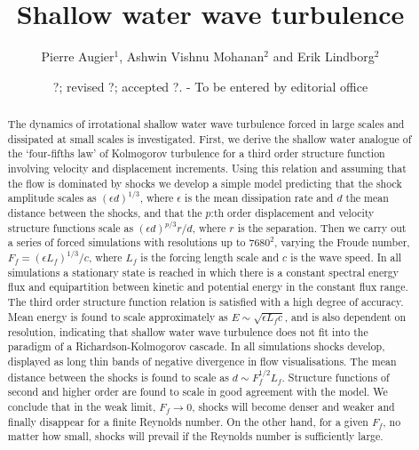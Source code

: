 \documentclass{jfm}
\title[Shallow water wave turbulence]%
{ Shallow water wave turbulence}
\author[P. Augier, A.V. Mohanan and E. Lindborg]%
{Pierre Augier$^{1}$,   Ashwin Vishnu Mohanan$^{2}$
and Erik Lindborg$^2$ \ns }
\affiliation{$^2$ KTH Mechanics,
SE-100 44 Stockholm, Sweden\\[\affilskip]
$^1$ LEGI, BP53,
38041 Grenoble Cedex, France}
\date{?; revised ?; accepted ?. - To be entered by editorial office}
\begin{document}
\maketitle



\begin{abstract}

The dynamics of irrotational shallow water wave turbulence forced in large
scales and dissipated at small scales is investigated. First, we derive the
shallow water analogue of the `four-fifths law' of Kolmogorov turbulence
for a third order structure function involving velocity and displacement
increments. Using this relation and assuming that the flow is dominated by
shocks we develop a simple model predicting that the shock amplitude scales as
$ (\epsilon d)^{1/3} $, where $ \epsilon $ is the mean dissipation rate and $ d $
the mean distance between the shocks, and that the $ p $:th order displacement
and velocity structure functions scale as $ (\epsilon d)^{p/3} r/d $, where $ r $
is the separation. Then we carry out a series of forced simulations with
resolutions up to $7680^2$, varying the Froude number, $F_{f} = (\epsilon L_f)^{1/3}/
c $, where $ L_f $ is the forcing length scale  and $c$ is the wave
speed. In all simulations a stationary state is reached in which there is a
constant spectral energy flux and equipartition between kinetic and potential
energy in the constant flux range. The third order structure function relation
is satisfied with a high degree of accuracy. Mean energy is found to scale approximately as $
E \sim \sqrt{\epsilon  L_f  c} $, and is also dependent on resolution, indicating
that shallow water wave turbulence does not fit into the paradigm of a
Richardson-Kolmogorov cascade. In all simulations shocks develop, displayed as
long thin bands of negative divergence in flow visualisations. The mean
distance between the shocks is found to scale as $ d \sim F_f^{1/2} L_f $.
Structure functions of second and higher order are found to scale in good
agreement with the model. We conclude that in the weak limit, $ F_f \rightarrow
0 $, shocks will become denser and weaker and finally disappear for a finite
Reynolds number. On the other hand, for a given $ F_{f} $, no matter how small,
shocks will prevail if the Reynolds number is sufficiently large.

\end{abstract}

\end{document}
